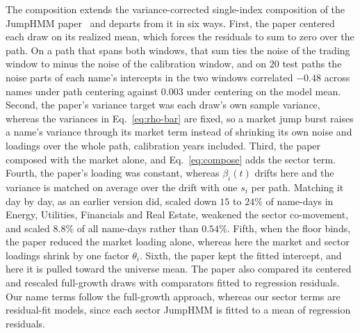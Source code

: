 The composition extends the variance-corrected single-index composition of the JumpHMM
paper~\cite{alswaidan2026variance} and departs from it in six ways. First, the paper centered each draw on its
realized mean, which forces the residuals to sum to zero over the path. On a path that spans both windows, that sum
ties the noise of the trading window to minus the noise of the calibration window, and on $20$ test paths the noise
parts of each name's intercepts in the two windows correlated $-0.48$ across names under path centering against
$0.003$ under centering on the model mean. Second, the paper's variance target was each draw's own sample variance,
whereas the variances in Eq.~\eqref{eq:rho-bar} are fixed, so a market jump burst raises a name's variance through
its market term instead of shrinking its own noise and loadings over the whole path, calibration years included.
Third, the paper composed with the market alone, and Eq.~\eqref{eq:compose} adds the sector term. Fourth, the paper's
loading was constant, whereas $\beta_i(t)$ drifts here and the variance is matched on average over the drift with one
$s_i$ per path. Matching it day by day, as an earlier version did, scaled down $15$ to $24\%$ of name-days in Energy,
Utilities, Financials and Real Estate, weakened the sector co-movement, and scaled $8.8\%$ of all name-days rather
than $0.54\%$. Fifth, when the floor binds, the paper reduced the market loading alone, whereas here the market and
sector loadings shrink by one factor $\theta_i$. Sixth, the paper kept the fitted intercept, and here it is pulled
toward the universe mean. The paper also compared its centered and rescaled full-growth draws with comparators fitted
to regression residuals. Our name terms follow the full-growth approach, whereas our sector terms are residual-fit
models, since each sector JumpHMM is fitted to a mean of regression residuals.

